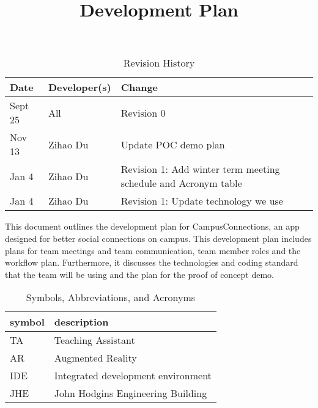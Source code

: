 \documentclass{article}
\title{Development Plan\\\progname}
\author{\authname}
\date{}
\begin{document}
\maketitle

\begin{table}[hp]
\caption{Revision History} \label{TblRevisionHistory}
\begin{tabularx}{\textwidth}{llX}
\toprule
\textbf{Date} & \textbf{Developer(s)} & \textbf{Change}\\
\midrule
Sept 25 & All & Revision 0\\
Nov 13 & Zihao Du & Update POC demo plan\\
Jan 4 & Zihao Du & Revision 1: Add winter term meeting schedule and Acronym table\\
Jan 4 & Zihao Du & Revision 1: Update technology we use\\
\bottomrule
\end{tabularx}
\end{table}

This document outlines the development plan for CampusConnections, an app designed for better social connections on campus. This development plan includes plans for team meetings and team communication, team member roles and the workflow plan.  Furthermore,  it discusses the technologies and coding standard that the team will be using and the plan for the proof of concept demo. 

\begin{table}[H]
\center
\caption{Symbols, Abbreviations, and Acronyms} \label{Acronyms}
\begin{tabular}{l l} 
  \toprule		
  \textbf{symbol} & \textbf{description}\\
  \midrule 
  TA & Teaching Assistant\\
  \midrule
  AR & Augmented Reality\\
  \midrule
  IDE & Integrated development environment\\
  \midrule
  JHE & John Hodgins Engineering Building\\
  \bottomrule
\end{tabular}\\
\end{table}
\newpage
\end{document}
